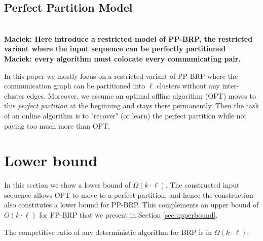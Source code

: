\documentclass[manuscript,screen=true]{acmart}
\newcommand{\OBRP}{BRP}
\newcommand{\PPOBRP}{PP-BRP}
\newcommand\maciek[1]{\color{brown}\textbf{\\ Maciek: #1}\color{black}}
\begin{document}
\subsection{Perfect Partition Model}\label{sec:perfectPartition}
\maciek{Here introduce a restricted model of \PPOBRP{}, the restricted variant where the input sequence can be perfectly partitioned}
\maciek{ every algorithm must colocate every communicating pair.}

In this paper we mostly focus on a restricted variant of   \PPOBRP{}
where the communication graph can be partitioned into $\ell$ clusters without any inter-cluster edges.
Moreover, we assume an optimal offline algorithm (OPT) moves to this \emph{perfect partition}
at the beginning and stays there permanently.
Then the task of an online algorithm is to "recover" (or learn) the perfect partition while not paying too much more than OPT.

\section{Lower bound} %

In this section we show a lower bound of $\Omega(k \cdot \ell)$.
The constructed input sequence allows OPT to move to a perfect partition, and hence
the construction also constitutes a lower bound for \PPOBRP{}.
This complements an upper bound of $O(k \cdot \ell)$
for \PPOBRP{} that we present in Section \ref{sec:upperbound}.

\begin{theorem}
  The competitive ratio of any deterministic algorithm for \OBRP{} is in $\Omega(k\cdot \ell)$.
\end{theorem}
\end{document}
